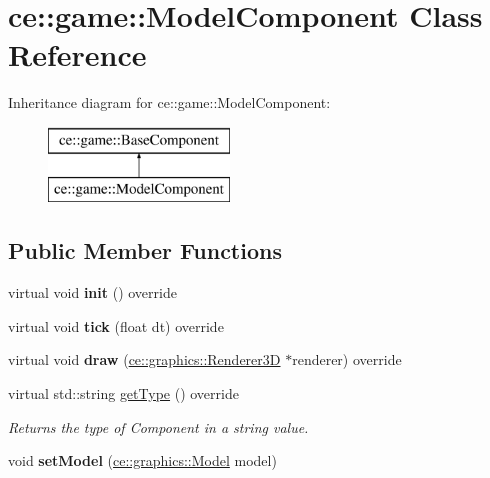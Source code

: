 \hypertarget{classce_1_1game_1_1_model_component}{}\section{ce\+:\+:game\+:\+:Model\+Component Class Reference}
\label{classce_1_1game_1_1_model_component}
Inheritance diagram for ce\+:\+:game\+:\+:Model\+Component\+:\begin{figure}[H]
\begin{center}
\leavevmode
\includegraphics[height=2.000000cm]{classce_1_1game_1_1_model_component}
\end{center}
\end{figure}
\subsection*{Public Member Functions}
\begin{DoxyCompactItemize}
\item 
\mbox{\label{classce_1_1game_1_1_model_component_afbfe9e210796b98160700daea8fd7946}} 
virtual void {\bfseries init} () override
\item 
\mbox{\label{classce_1_1game_1_1_model_component_a36b54a8ccafa5144204671429c490a9a}} 
virtual void {\bfseries tick} (float dt) override
\item 
\mbox{\label{classce_1_1game_1_1_model_component_aed3b814d2bdb0fb99cb280d963379d67}} 
virtual void {\bfseries draw} (\hyperlink{classce_1_1graphics_1_1_renderer3_d}{ce\+::graphics\+::\+Renderer3D} $\ast$renderer) override
\item 
virtual std\+::string \hyperlink{classce_1_1game_1_1_model_component_aaac15cad336e35df7be55dda34f53643}{get\+Type} () override
\begin{DoxyCompactList}\small\item\em Returns the type of Component in a string value. \end{DoxyCompactList}\item 
\mbox{\label{classce_1_1game_1_1_model_component_addc52f099ee60e0018af78c2c98a8751}} 
void {\bfseries set\+Model} (\hyperlink{classce_1_1graphics_1_1_model}{ce\+::graphics\+::\+Model} model)
\end{DoxyCompactItemize}

